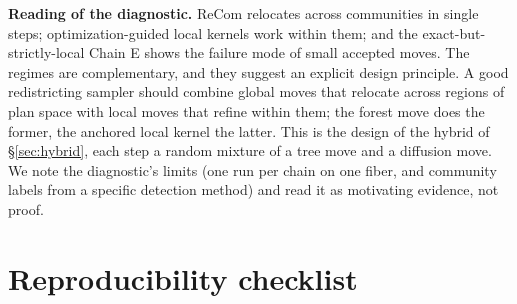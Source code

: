 \documentclass[11pt]{article}
\begin{document}
\textbf{Reading of the diagnostic.} ReCom relocates across
communities in single steps; optimization-guided local kernels work
within them; and the exact-but-strictly-local Chain E shows the
failure mode of small accepted moves. The regimes are complementary,
and they suggest an explicit design principle. A good redistricting
sampler should combine global moves that relocate across regions of
plan space with local moves that refine within them; the forest move
does the former, the anchored local kernel the latter. This is the
design of the hybrid of \S\ref{sec:hybrid}, each step a random mixture
of a tree move and a diffusion move. We note the diagnostic's limits
(one run per chain on one fiber, and community labels from a specific
detection method) and read it as motivating evidence, not proof.

\section{Reproducibility checklist}\label{app:reproducibility}
\end{document}
